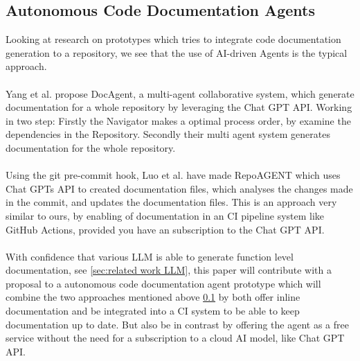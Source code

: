 \subsection{Autonomous Code Documentation Agents}
\label{sec: autonomus code documentaioin agents}
Looking at research on prototypes which tries to integrate code documentation generation to a repository, we see that the use of AI-driven Agents is the typical approach.
\\ \\
Yang et al.\cite{yang2025docagent} propose DocAgent, a multi-agent collaborative system, which generate documentation for a whole repository by leveraging the Chat GPT API. Working in two step: Firstly the Navigator makes a optimal process order, by examine the dependencies in the Repository. Secondly their multi agent system generates documentation for the whole repository.
\\ \\
Using the git pre-commit hook, Luo et al.\cite{luo2024repoagent} have made RepoAGENT which uses Chat GPTs API to created documentation files, which analyses the changes made in the commit, and updates the documentation files. This is an approach very similar to ours, by enabling of documentation in an CI pipeline system like GitHub Actions, provided you have an subscription to the Chat GPT API.
\\ \\
With confidence that various LLM is able to generate function level documentation, see \ref{sec:related work LLM}, this paper will contribute with a proposal to a autonomous code documentation agent prototype which will combine the two approaches mentioned above \ref{sec: autonomus code documentaioin agents} by both offer inline documentation and be integrated into a CI system to be able to keep documentation up to date. But also be in contrast by offering the agent as a free service without the need for a subscription to a cloud AI model, like Chat GPT API.

